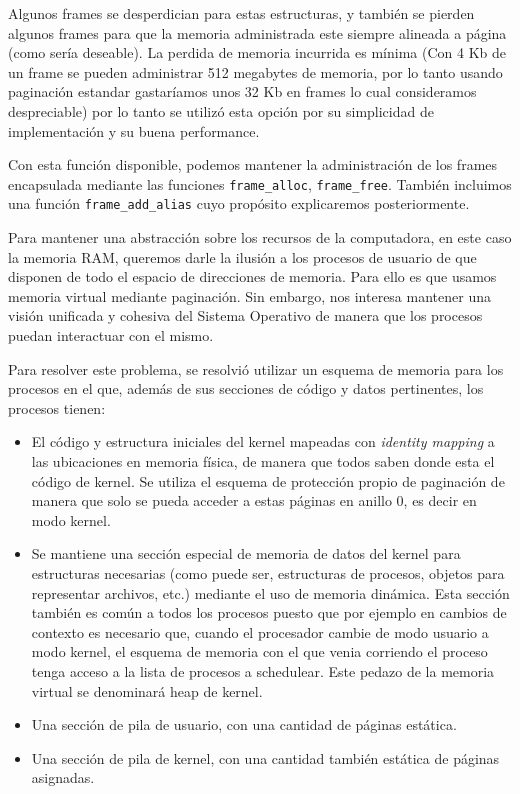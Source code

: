 Algunos frames se desperdician para estas estructuras, y tambi\'en se pierden algunos frames para que la memoria administrada
este siempre alineada a p\'agina (como ser\'ia deseable). La perdida de memoria incurrida es m\'inima (Con 4 Kb de un frame se
pueden administrar 512 megabytes de memoria, por lo tanto usando paginaci\'on estandar gastar\'iamos unos 32 Kb en frames lo cual
consideramos despreciable) por lo tanto se utiliz\'o esta opci\'on por su simplicidad de implementaci\'on y su buena performance.

Con esta funci\'on disponible, podemos mantener la administraci\'on de los frames encapsulada mediante las funciones \texttt{frame\_alloc},
\texttt{frame\_free}. Tambi\'en incluimos una funci\'on \texttt{frame\_add\_alias} cuyo prop\'osito explicaremos posteriormente.

Para mantener una abstracci\'on sobre los recursos de la computadora, en este caso la memoria RAM, queremos darle la ilusi\'on a los
procesos de usuario de que disponen de todo el espacio de direcciones de memoria. Para ello es que usamos memoria virtual mediante paginaci\'on.
Sin embargo, nos interesa mantener una visi\'on unificada y cohesiva del Sistema Operativo de manera que los procesos puedan interactuar con
el mismo.

Para resolver este problema, se resolvi\'o utilizar un esquema de memoria para los procesos en el que, adem\'as de sus secciones de c\'odigo
y datos pertinentes, los procesos tienen:

\begin{itemize}
	\item El c\'odigo y estructura iniciales del kernel mapeadas con \textit{identity mapping} a las ubicaciones en memoria f\'isica, de
	manera que todos saben donde esta el c\'odigo de kernel. Se utiliza el esquema de protecci\'on propio de paginaci\'on de manera que
	solo se pueda acceder a estas p\'aginas en anillo 0, es decir en modo kernel.
	\item Se mantiene una secci\'on especial de memoria de datos del kernel para estructuras necesarias (como puede ser, estructuras de
	procesos, objetos para representar archivos, etc.) mediante el uso de memoria din\'amica. Esta secci\'on tambi\'en es com\'un a todos
	los procesos puesto que por ejemplo en cambios de contexto es necesario que, cuando el procesador cambie de modo usuario a modo kernel,
	el esquema de memoria con el que venia corriendo el proceso tenga acceso a la lista de procesos a schedulear. Este pedazo de la memoria
	virtual se denominar\'a heap de kernel.
	\item Una secci\'on de pila de usuario, con una cantidad de p\'aginas est\'atica.
	\item Una secci\'on de pila de kernel, con una cantidad tambi\'en est\'atica de p\'aginas asignadas.
\end{itemize}

